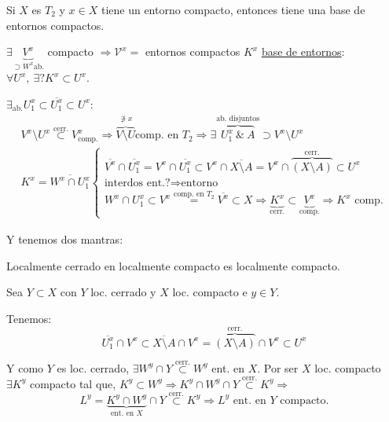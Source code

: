 \begin{prop}
Si $X$ es $T_2$ y $x \in X$ tiene un entorno compacto, entonces tiene una base de entornos compactos.
\end{prop}
\begin{demo}
    $\exists \underbrace{V^x}_{\supset W^x \text{ab.}}$ compacto $\Rightarrow \mathcal{V}^x =$ { entornos compactos $K^x$} \underline{base de entornos}: $\forall U^x,\ \exists?K^x \subset U^x$.

    $\exists_{\text{ab.}} U_1^x \subset \overline{U_1^x} \subset U^x$:
    \begin{gather*}
        V^x\setminus U^x \stackrel{\text{cerr.}}{\subset} V_{\text{comp.}}^x \Rightarrow \overbrace{V \setminus U}^{\not\ni x} \text{comp. en } T_2 \Rightarrow \exists \overbrace{U_1^x\ \&\ A}^{\text{ab. disjuntos}} \supset V^x \setminus U^x\\
        K^x = \overline{W^x \cap U_1^x} \begin{cases}
            \overline{V^x} \cap \overline{U_1^x} = V^x \cap \overline{U_1^x} \subset V^x \cap \overline{X \setminus A} = V^x \cap \overbrace{\left( X \setminus A \right)}^{\text{cerr.}} \subset U^x\\
            \text{interdos ent.?} \Rightarrow \text{entorno}\\
            W^x \cap U_1^x \subset V^x \stackrel{\text{comp. en } T_2}{=} \overline{V^x} \subset X \Rightarrow \underbrace{K^x}_{\text{cerr.}} \subset \underbrace{V^x}_{\text{comp.}} \Rightarrow K^x \text{ comp.} 
        \end{cases}  
    \end{gather*}
\end{demo}

Y tenemos dos mantras:
\begin{prop}[Mantra 1]
Localmente cerrado en localmente compacto es localmente compacto. 
\end{prop}
\begin{demo}
    Sea $Y \subset X$ con $Y$ loc. cerrado y $X$ loc. compacto e $y \in Y$.

    Tenemos:
    \[
    \overline{U_1^x} \cap V^x \subset \overline{X \setminus A} \cap V^x = \overbrace{\left( X \setminus A \right)}^{\text{cerr.}} \cap V^x \subset U^x
    \]

    Y como $Y$ es loc. cerrado, $\exists W^y \cap Y \stackrel{\text{cerr.}}{\subset} W^y$ ent. en $X$. Por ser $X$ loc. compacto $\exists K^y$ compacto tal que, $K^y \subset W^y \Rightarrow K^y \cap W^y \cap Y \stackrel{\text{cerr.}}{\subset} K^y \Rightarrow$
    \[
    L^y = \underbrace{K^y \cap W^y}_{\text{ent. en } X} \cap Y \stackrel{\text{cerr.}}{\subset} K^y \Rightarrow L^y \text{ ent. en } Y \text{ compacto.}  
    \]
\end{demo}

